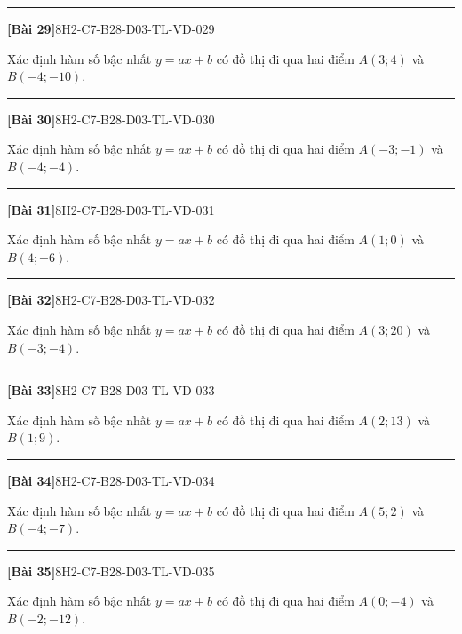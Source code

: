 \documentclass[12pt,a4paper]{article}
\newif\ifloigiai
\newenvironment{cauhoi}[2]{%
  \par\medskip\noindent\rule{\textwidth}{0.4pt}\par\nopagebreak
  \noindent\textbf{[#1]}\hfill{\scriptsize\ttfamily #2}\par\nopagebreak\smallskip}{\par}
\newcommand{\loigiai}[1]{\ifloigiai\par\smallskip\noindent\textit{Lời giải.} #1\par\fi}
\begin{document}
\begin{cauhoi}{Bài 29}{8H2-C7-B28-D03-TL-VD-029}
Xác định hàm số bậc nhất $y=ax+b$ có đồ thị đi qua hai điểm $A(3;4)$ và $B(-4;-10)$.
\loigiai{Thay toạ độ $A$, $B$ vào $y=ax+b$ ta có hệ $4=3a+b$ và $-10=-4a+b$. Trừ hai vế: $a=\dfrac{4+10}{3+4}=2$. Suy ra $b=4-2\cdot(3)=-2$. Vậy $y=2x-2$.}
\end{cauhoi}
\begin{cauhoi}{Bài 30}{8H2-C7-B28-D03-TL-VD-030}
Xác định hàm số bậc nhất $y=ax+b$ có đồ thị đi qua hai điểm $A(-3;-1)$ và $B(-4;-4)$.
\loigiai{Thay toạ độ $A$, $B$ vào $y=ax+b$ ta có hệ $-1=-3a+b$ và $-4=-4a+b$. Trừ hai vế: $a=\dfrac{-1+4}{-3+4}=3$. Suy ra $b=-1-3\cdot(-3)=8$. Vậy $y=3x+8$.}
\end{cauhoi}
\begin{cauhoi}{Bài 31}{8H2-C7-B28-D03-TL-VD-031}
Xác định hàm số bậc nhất $y=ax+b$ có đồ thị đi qua hai điểm $A(1;0)$ và $B(4;-6)$.
\loigiai{Thay toạ độ $A$, $B$ vào $y=ax+b$ ta có hệ $0=a+b$ và $-6=4a+b$. Trừ hai vế: $a=\dfrac{0+6}{1-4}=-2$. Suy ra $b=0+2\cdot(1)=2$. Vậy $y=-2x+2$.}
\end{cauhoi}
\begin{cauhoi}{Bài 32}{8H2-C7-B28-D03-TL-VD-032}
Xác định hàm số bậc nhất $y=ax+b$ có đồ thị đi qua hai điểm $A(3;20)$ và $B(-3;-4)$.
\loigiai{Thay toạ độ $A$, $B$ vào $y=ax+b$ ta có hệ $20=3a+b$ và $-4=-3a+b$. Trừ hai vế: $a=\dfrac{20+4}{3+3}=4$. Suy ra $b=20-4\cdot(3)=8$. Vậy $y=4x+8$.}
\end{cauhoi}
\begin{cauhoi}{Bài 33}{8H2-C7-B28-D03-TL-VD-033}
Xác định hàm số bậc nhất $y=ax+b$ có đồ thị đi qua hai điểm $A(2;13)$ và $B(1;9)$.
\loigiai{Thay toạ độ $A$, $B$ vào $y=ax+b$ ta có hệ $13=2a+b$ và $9=a+b$. Trừ hai vế: $a=\dfrac{13-9}{2-1}=4$. Suy ra $b=13-4\cdot(2)=5$. Vậy $y=4x+5$.}
\end{cauhoi}
\begin{cauhoi}{Bài 34}{8H2-C7-B28-D03-TL-VD-034}
Xác định hàm số bậc nhất $y=ax+b$ có đồ thị đi qua hai điểm $A(5;2)$ và $B(-4;-7)$.
\loigiai{Thay toạ độ $A$, $B$ vào $y=ax+b$ ta có hệ $2=5a+b$ và $-7=-4a+b$. Trừ hai vế: $a=\dfrac{2+7}{5+4}=1$. Suy ra $b=2-1\cdot(5)=-3$. Vậy $y=x-3$.}
\end{cauhoi}
\begin{cauhoi}{Bài 35}{8H2-C7-B28-D03-TL-VD-035}
Xác định hàm số bậc nhất $y=ax+b$ có đồ thị đi qua hai điểm $A(0;-4)$ và $B(-2;-12)$.
\loigiai{Thay toạ độ $A$, $B$ vào $y=ax+b$ ta có hệ $-4=0a+b$ và $-12=-2a+b$. Trừ hai vế: $a=\dfrac{-4+12}{0+2}=4$. Suy ra $b=-4-4\cdot(0)=-4$. Vậy $y=4x-4$.}
\end{cauhoi}
\end{document}
